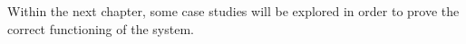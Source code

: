 Within the next chapter, some case studies will be explored in order to prove the correct functioning of the system.

